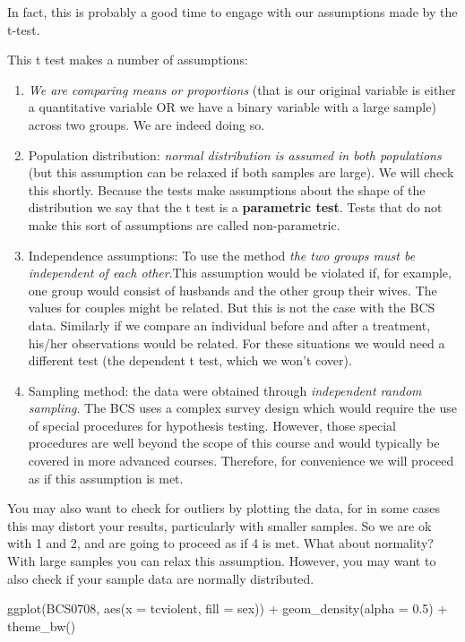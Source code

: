\documentclass[
]{book}
\newenvironment{Shaded}{\begin{snugshade}}{\end{snugshade}}
\newcommand{\AttributeTok}[1]{\textcolor[rgb]{0.77,0.63,0.00}{#1}}
\newcommand{\FloatTok}[1]{\textcolor[rgb]{0.00,0.00,0.81}{#1}}
\newcommand{\FunctionTok}[1]{\textcolor[rgb]{0.00,0.00,0.00}{#1}}
\newcommand{\NormalTok}[1]{#1}
\newcommand{\SpecialCharTok}[1]{\textcolor[rgb]{0.00,0.00,0.00}{#1}}
\begin{document}
In fact, this is probably a good time to engage with our assumptions made by the t-test.

This t test makes a number of assumptions:

\begin{enumerate}
\def\labelenumi{\arabic{enumi}.}
\item
  \emph{We are comparing means or proportions} (that is our original variable is either a quantitative variable OR we have a binary variable with a large sample) across two groups. We are indeed doing so.
\item
  Population distribution: \emph{normal distribution is assumed in both populations} (but this assumption can be relaxed if both samples are large). We will check this shortly. Because the tests make assumptions about the shape of the distribution we say that the t test is a \textbf{parametric test}. Tests that do not make this sort of assumptions are called non-parametric.
\item
  Independence assumptions: To use the method \emph{the two groups must be independent of each other}.This assumption would be violated if, for example, one group would consist of husbands and the other group their wives. The values for couples might be related. But this is not the case with the BCS data. Similarly if we compare an individual before and after a treatment, his/her observations would be related. For these situations we would need a different test (the dependent t test, which we won't cover).
\item
  Sampling method: the data were obtained through \emph{independent random sampling}. The BCS uses a complex survey design which would require the use of special procedures for hypothesis testing. However, those special procedures are well beyond the scope of this course and would typically be covered in more advanced courses. Therefore, for convenience we will proceed as if this assumption is met.
\end{enumerate}

You may also want to check for outliers by plotting the data, for in some cases this may distort your results, particularly with smaller samples. So we are ok with 1 and 2, and are going to proceed as if 4 is met. What about normality? With large samples you can relax this assumption. However, you may want to also check if your sample data are normally distributed.

\begin{Shaded}
\begin{Highlighting}[]
\FunctionTok{ggplot}\NormalTok{(BCS0708, }\FunctionTok{aes}\NormalTok{(}\AttributeTok{x =}\NormalTok{ tcviolent, }\AttributeTok{fill =}\NormalTok{ sex)) }\SpecialCharTok{+}
  \FunctionTok{geom\_density}\NormalTok{(}\AttributeTok{alpha =} \FloatTok{0.5}\NormalTok{) }\SpecialCharTok{+}
  \FunctionTok{theme\_bw}\NormalTok{()}
\end{Highlighting}
\end{Shaded}
\end{document}
